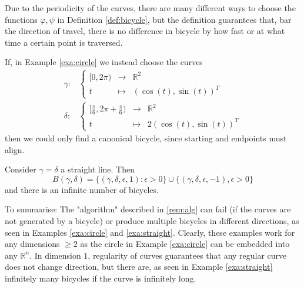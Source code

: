 \documentclass[11pt]{article}
\begin{document}
\begin{remark}
Due to the periodicity of the curves, there are many different ways to choose the functions $\varphi, \psi$ in Definition \ref{def:bicycle}, but the definition guarantees that, bar the direction of travel, there is no difference in bicycle by how fast or at what time a certain point is traversed.
\end{remark}
\begin{remark}
If, in Example \ref{exa:circle} we instead choose the curves
\begin{align*}
\gamma:&
    \left\{
    \begin{array}{ccl}
        [0,2\pi)& \to & \mathbb R^2 \\
        t & \mapsto & (\cos(t),\sin(t))^T
     \end{array}
     \right.
     \\
\delta:&
    \left\{
    \begin{array}{ccl}
        [\frac\pi6,2\pi+\frac\pi6) & \to & \mathbb R^2 \\
        t & \mapsto & 2(\cos(t),\sin(t))^T
     \end{array}
     \right.
\end{align*}
then we could only find a canonical bicycle, since starting and endpoints must align.
\end{remark}
\begin{example}\label{exa:straight}
Consider $\gamma= \delta$ a straight line. Then $$B(\gamma,\delta) = \{(\gamma, \delta,\epsilon, 1): \epsilon>0\}\cup\{(\gamma,\delta,\epsilon,-1), \epsilon >0\}$$ and there is an infinite number of bicycles.
\end{example}
\begin{remark}
To summarise: The "algorithm" described in \ref{rem:alg} can fail (if the curves are not generated by a bicycle) or produce multiple bicycles in different directions, as seen in Examples \ref{exa:circle} and \ref{exa:straight}. Clearly, these examples work for any dimensions $\geq 2$ as the circle in Example \ref{exa:circle} can be embedded into any $\mathbb R^n$. In dimension $1$, regularity of curves guarantees that any regular curve does not change direction, but there are, as seen in Example \ref{exa:straight} infinitely many bicycles if the curve is infinitely long.
\end{remark}
\end{document}
